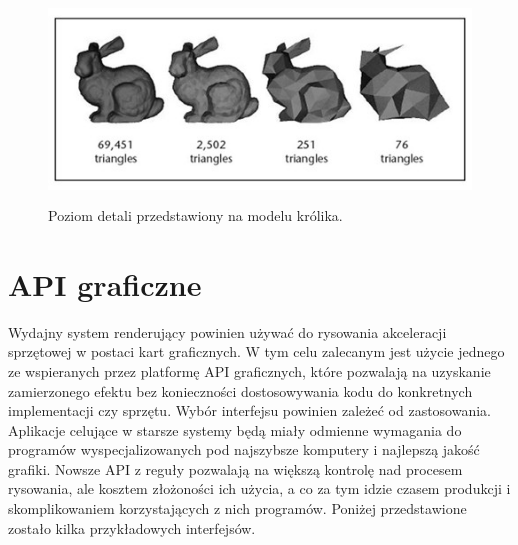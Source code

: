 \begin{itemize}
	\begin{figure}[htbp]
		\centering
		\includegraphics[width=4.975in,height=2.13971in]{images/13_LOD_rabbit.jpg}
		\caption{Poziom detali przedstawiony na modelu królika. \cite{3dstudio:lod:2024}}
	\end{figure}
\end{itemize}

\section{API graficzne}

Wydajny system renderujący powinien używać do rysowania akceleracji sprzętowej w postaci kart graficznych. W tym celu zalecanym jest użycie jednego ze wspieranych przez platformę API graficznych, które pozwalają na uzyskanie zamierzonego efektu bez konieczności dostosowywania kodu do konkretnych implementacji czy sprzętu. Wybór interfejsu powinien zależeć od zastosowania. Aplikacje celujące w starsze systemy będą miały odmienne wymagania do programów wyspecjalizowanych pod najszybsze komputery i najlepszą jakość grafiki. Nowsze API z reguły pozwalają na większą kontrolę nad procesem rysowania, ale kosztem złożoności ich użycia, a co za tym idzie czasem produkcji i skomplikowaniem korzystających z nich programów. Poniżej przedstawione zostało kilka przykładowych interfejsów.

